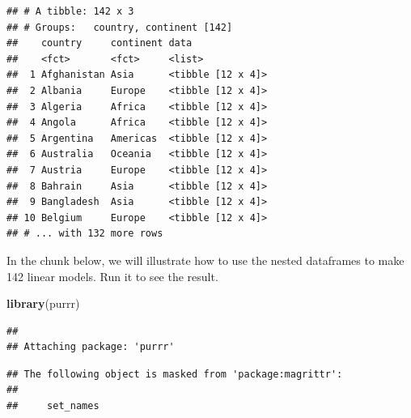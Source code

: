 \documentclass[
]{book}
\newenvironment{Shaded}{\begin{snugshade}}{\end{snugshade}}
\newcommand{\KeywordTok}[1]{\textcolor[rgb]{0.13,0.29,0.53}{\textbf{#1}}}
\newcommand{\NormalTok}[1]{#1}
\newcommand{\OperatorTok}[1]{\textcolor[rgb]{0.81,0.36,0.00}{\textbf{#1}}}
\newcommand{\StringTok}[1]{\textcolor[rgb]{0.31,0.60,0.02}{#1}}
\begin{document}
\begin{Shaded}
\end{Shaded}

\begin{verbatim}
## # A tibble: 142 x 3
## # Groups:   country, continent [142]
##    country     continent data             
##    <fct>       <fct>     <list>           
##  1 Afghanistan Asia      <tibble [12 x 4]>
##  2 Albania     Europe    <tibble [12 x 4]>
##  3 Algeria     Africa    <tibble [12 x 4]>
##  4 Angola      Africa    <tibble [12 x 4]>
##  5 Argentina   Americas  <tibble [12 x 4]>
##  6 Australia   Oceania   <tibble [12 x 4]>
##  7 Austria     Europe    <tibble [12 x 4]>
##  8 Bahrain     Asia      <tibble [12 x 4]>
##  9 Bangladesh  Asia      <tibble [12 x 4]>
## 10 Belgium     Europe    <tibble [12 x 4]>
## # ... with 132 more rows
\end{verbatim}

In the chunk below, we will illustrate how to use the nested dataframes to make 142 linear models.
Run it to see the result.

\begin{Shaded}
\begin{Highlighting}[]
\KeywordTok{library}\NormalTok{(purrr)}
\end{Highlighting}
\end{Shaded}

\begin{verbatim}
## 
## Attaching package: 'purrr'
\end{verbatim}

\begin{verbatim}
## The following object is masked from 'package:magrittr':
## 
##     set_names
\end{verbatim}
\end{document}
